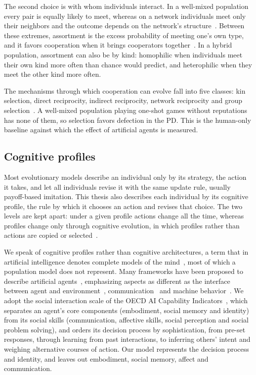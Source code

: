 The second choice is with whom individuals interact. In a well-mixed population every pair is equally likely to meet, whereas on a network individuals meet only their neighbors and the outcome depends on the network's structure~\cite{allenEvolutionaryDynamicsAny2017}. Between these extremes, assortment is the excess probability of meeting one's own type, and it favors cooperation when it brings cooperators together~\cite{Eshel1982}. In a hybrid population, assortment can also be by kind: homophilic when individuals meet their own kind more often than chance would predict, and heterophilic when they meet the other kind more often.

The mechanisms through which cooperation can evolve fall into five classes: kin selection, direct reciprocity, indirect reciprocity, network reciprocity and group selection~\cite{Nowak2006}. A well-mixed population playing one-shot games without reputations has none of them, so selection favors defection in the PD. This is the human-only baseline against which the effect of artificial agents is measured.

\subsection{Cognitive profiles}

Most evolutionary models describe an individual only by its strategy, the action it takes, and let all individuals revise it with the same update rule, usually payoff-based imitation. This thesis also describes each individual by its cognitive profile, the rule by which it chooses an action and revises that choice. The two levels are kept apart: under a given profile actions change all the time, whereas profiles change only through cognitive evolution, in which profiles rather than actions are copied or selected~\cite{Cardillo2010, Bear2016}.

We speak of cognitive profiles rather than cognitive architectures, a term that in artificial intelligence denotes complete models of the mind~\cite{Kotseruba2020}, most of which a population model does not represent. Many frameworks have been proposed to describe artificial agents~\cite{allmendingerMultiagentAI2026}, emphasizing aspects as different as the interface between agent and environment~\cite{stahleDesignSpaceIntelligent2025}, communication~\cite{borghoffHumanartificialInteractionAge2025} and machine behavior~\cite{rahwanMachineBehaviour2019}. We adopt the social interaction scale of the OECD AI Capability Indicators~\cite{oecdIntroducingOECDAI2025}, which separates an agent's core components (embodiment, social memory and identity) from its social skills (communication, affective skills, social perception and social problem solving), and orders its decision process by sophistication, from pre-set responses, through learning from past interactions, to inferring others' intent and weighing alternative courses of action. Our model represents the decision process and identity, and leaves out embodiment, social memory, affect and communication.

